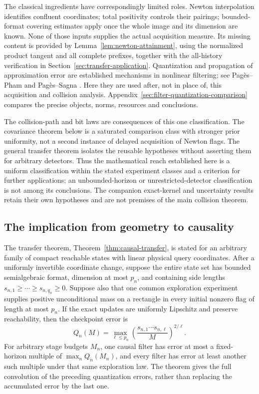 The classical ingredients have correspondingly limited roles. Newton
interpolation identifies confluent coordinates; total positivity
controls their pairings; bounded-format covering estimates apply once
the whole image and its dimension are known. None of those inputs
supplies the actual acquisition measure. Its missing content is provided
by Lemma~\ref{lem:newton-attainment}, using the normalized product
tangent and all complete prefixes, together with the all-history
verification in Section~\ref{sec:transfer-application}. Quantization
and propagation of approximation error are established mechanisms in
nonlinear filtering; see Pag\`es--Pham \cite{PagesPham2005} and
Pag\`es--Sagna \cite[Section 6]{PagesSagna2018}. Here they are used
after, not in place of, this acquisition and collision analysis.
Appendix~\ref{sec:filter-quantization-comparison} compares the precise
objects, norms, resources and conclusions.

The collision-path and bit laws are consequences of this one
classification. The covariance theorem below is a saturated comparison
class with stronger prior uniformity, not a second instance of delayed
acquisition of Newton flags. The general transfer theorem isolates the
reusable hypotheses without asserting them for arbitrary detectors.
Thus the mathematical reach established here is a uniform classification
within the stated experiment classes and a criterion for further
applications; an unbounded-horizon or unrestricted-detector classification
is not among its conclusions. The companion exact-kernel and uncertainty
results retain their own hypotheses and are not premises of the main
collision theorem.

\subsection{The implication from geometry to causality}
The transfer theorem, Theorem~\ref{thm:causal-transfer}, is stated for
an arbitrary family of compact reachable states with linear physical
query coordinates. After a uniformly invertible coordinate change,
suppose the entire state set has bounded semialgebraic format,
dimension at most $p_n$, and containing side lengths
$s_{n,1}\ge\cdots\ge s_{n,q_n}\ge0$. Suppose also that one common
exploration experiment supplies positive unconditional mass on a
rectangle in every initial nonzero flag of length at most $p_n$.
If the exact updates are uniformly Lipschitz and preserve reachability,
then the checkpoint error is
\[
 Q_n(M)=\max_{\ell\le p_n}
       \left(\frac{s_{n,1}\cdots s_{n,\ell}}{M}\right)^{2/\ell}.
\]
For arbitrary stage budgets $M_n$, one causal filter has error at most
a fixed-horizon multiple of $\max_n Q_n(M_n)$, and every filter has
error at least another such multiple under that same exploration law.
The theorem gives the full convolution of the preceding quantization
errors, rather than replacing the accumulated error by the last one.

